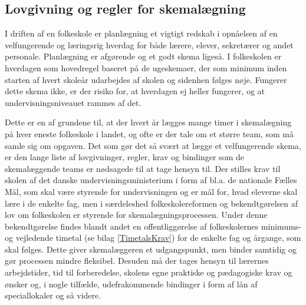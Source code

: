\subsection{Lovgivning og regler for skemalægning}
\label{Lovgivning_og_regler}
I driften af en folkeskole er planlægning et vigtigt redskab i opnåelsen af en velfungerende og læringsrig hverdag for både lærere, elever, sekretærer og andet personale. Planlægning er afgørende og et godt skema ligeså. I folkeskolen er hverdagen som hovedregel baseret på de ugeskemaer, der som minimum inden starten af hvert skoleår udarbejdes af skolen og sidenhen følges nøje\cite{interview_Kaerby}. Fungerer dette skema ikke, er der risiko for, at hverdagen ej heller fungerer, og at undervisningsniveauet rammes af det.

Dette er en af grundene til, at der hvert år lægges mange timer i skemalægning på hver eneste folkeskole i landet, og ofte er der tale om et større team\cite{interview_Kaerby}\cite{interview_Tingstrup}, som må samle sig om opgaven. Det som gør det så svært at lægge et velfungerende skema, er den lange liste af lovgivninger, regler, krav og bindinger som de skemalæggende teams er nødsagede til at tage hensyn til. Der stilles krav til skolen af det danske undervisningsministerium i form af bl.a. de nationale Fælles Mål\cite{fmaal}, som skal være styrende for undervisningen og er mål for, hvad eleverne skal lære i de enkelte fag, men i særdeleshed folkeskolereformen og bekendtgørelsen af lov om folkeskolen\cite{Lovgivning} er styrende for skemalægningsprocessen. Under denne bekendtgørelse findes blandt andet en offentliggørelse af folkeskolernes minimums- og vejledende timetal (se bilag \ref{TimetalsKrav}) for de enkelte fag og årgange, som skal følges. Dette giver skemalæggeren et udgangspunkt, men binder samtidig og gør processen mindre fleksibel. Desuden må der tages hensyn til lærernes arbejdstider, tid til forberedelse, skolens egne praktiske og pædagogiske krav og ønsker og, i nogle tilfælde, udefrakommende bindinger i form af lån af speciallokaler og så videre.
